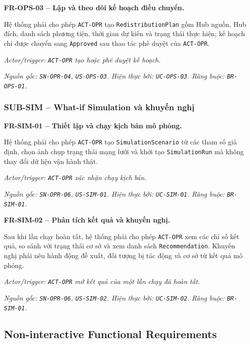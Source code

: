 \medskip
\noindent\textbf{FR-OPS-03 -- Lập và theo dõi kế hoạch điều chuyển.}\par
\nopagebreak[4]
Hệ thống phải cho phép \texttt{ACT-OPR} tạo \texttt{RedistributionPlan} gồm Hub nguồn, Hub đích, danh sách phương tiện, thời gian dự kiến và trạng thái thực hiện; kế hoạch chỉ được chuyển sang \texttt{Approved} sau thao tác phê duyệt của \texttt{ACT-OPR}.

\textit{Actor/trigger: \texttt{ACT-OPR} tạo hoặc phê duyệt kế hoạch.}\par
\textit{Nguồn gốc: \texttt{SN-OPR-04}, \texttt{US-OPS-03}. Hiện thực bởi: \texttt{UC-OPS-03}. Ràng buộc: \texttt{BR-OPS-01}.}

\subsubsection{SUB-SIM -- What-if Simulation và khuyến nghị}

\noindent\textbf{FR-SIM-01 -- Thiết lập và chạy kịch bản mô phỏng.}\par
\nopagebreak[4]
Hệ thống phải cho phép \texttt{ACT-OPR} tạo \texttt{SimulationScenario} từ các tham số giả định, chọn ảnh chụp trạng thái mạng lưới và khởi tạo \texttt{SimulationRun} mà không thay đổi dữ liệu vận hành thật.

\textit{Actor/trigger: \texttt{ACT-OPR} xác nhận chạy kịch bản.}\par
\textit{Nguồn gốc: \texttt{SN-OPR-06}, \texttt{US-SIM-01}. Hiện thực bởi: \texttt{UC-SIM-01}. Ràng buộc: \texttt{BR-SIM-01}.}

\medskip
\noindent\textbf{FR-SIM-02 -- Phân tích kết quả và khuyến nghị.}\par
\nopagebreak[4]
Sau khi lần chạy hoàn tất, hệ thống phải cho phép \texttt{ACT-OPR} xem các chỉ số kết quả, so sánh với trạng thái cơ sở và xem danh sách \texttt{Recommendation}. Khuyến nghị phải nêu hành động đề xuất, đối tượng bị tác động và cơ sở từ kết quả mô phỏng.

\textit{Actor/trigger: \texttt{ACT-OPR} mở kết quả của một lần chạy đã hoàn tất.}\par
\textit{Nguồn gốc: \texttt{SN-OPR-06}, \texttt{US-SIM-02}. Hiện thực bởi: \texttt{UC-SIM-02}. Ràng buộc: \texttt{BR-SIM-01}.}

\subsection{Non-interactive Functional Requirements}

